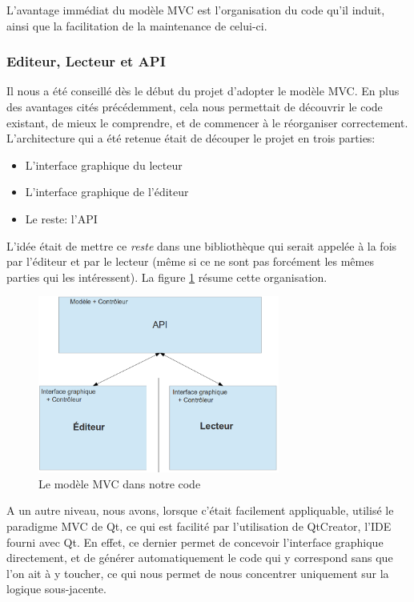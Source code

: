 L'avantage immédiat du modèle \ac{MVC} est l'organisation du code qu'il induit, ainsi que la facilitation de la maintenance de celui-ci.

\subsubsection{Editeur, Lecteur et \ac{API}}

Il nous a été conseillé dès le début du projet d'adopter le modèle \ac{MVC}. En plus des avantages cités précédemment, cela nous permettait de découvrir le code existant, de mieux le comprendre, et de commencer à le réorganiser correctement. L'architecture qui a été retenue était de découper le projet en trois parties:
\begin{itemize}
 \item L'interface graphique du lecteur
 \item L'interface graphique de l'éditeur
 \item Le reste: l'\ac{API}
\end{itemize}
L'idée était de mettre ce \textit{reste} dans une bibliothèque qui serait appelée à la fois par l'éditeur et par le lecteur (même si ce ne sont pas forcément les mêmes parties qui les intéressent). La figure \ref{mvc} résume cette organisation.

\begin{figure}[H]
\begin{center}
\includegraphics[width=300px]{mvc.png}
\caption{Le modèle MVC dans notre code}
\label{mvc}
\end{center}
\end{figure}


A un autre niveau, nous avons, lorsque c'était facilement appliquable, utilisé le paradigme \ac{MVC} de Qt, ce qui est facilité
par l'utilisation de QtCreator, l'IDE fourni avec Qt. En effet, ce dernier permet de concevoir l'interface graphique directement, et de générer automatiquement le code qui y correspond sans que l'on ait à y toucher, ce qui nous permet de nous concentrer uniquement sur la logique sous-jacente.

